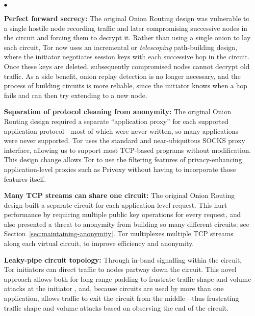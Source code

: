 \documentclass[times,10pt,twocolumn]{article}
\newenvironment{tightlist}{\begin{list}{$\bullet$}{
  \setlength{\itemsep}{0mm}
    \setlength{\parsep}{0mm}
    }}{\end{list}}
\begin{document}
\begin{tightlist}

\item \textbf{Perfect forward secrecy:} The original Onion Routing
design was vulnerable to a single hostile node recording traffic and
later compromising successive nodes in the circuit and forcing them
to decrypt it.  Rather than using a single onion to lay each circuit,
Tor now uses an incremental or \emph{telescoping} path-building design,
where the initiator negotiates session keys with each successive hop in
the circuit.  Once these keys are deleted, subsequently compromised nodes
cannot decrypt old traffic.  As a side benefit, onion replay detection
is no longer necessary, and the process of building circuits is more
reliable, since the initiator knows when a hop fails and can then try
extending to a new node.

\item \textbf{Separation of protocol cleaning from anonymity:}
The original Onion Routing design required a separate ``application
proxy'' for each supported application protocol---most of which were
never written, so many applications were never supported.  Tor uses the
standard and near-ubiquitous SOCKS \cite{socks4} proxy interface, allowing
us to support most TCP-based programs without modification.  This design
change allows Tor to use the filtering features of privacy-enhancing
application-level proxies such as Privoxy \cite{privoxy} without having
to incorporate those features itself.

\item \textbf{Many TCP streams can share one circuit:} The
original Onion Routing design built a separate circuit for each
application-level request.  This hurt performance by requiring
multiple public key operations for every request, and also presented
a threat to anonymity from building so many different circuits; see
Section~\ref{sec:maintaining-anonymity}.  Tor multiplexes multiple TCP
streams along each virtual circuit, to improve efficiency and anonymity.

\item \textbf{Leaky-pipe circuit topology:} Through in-band signalling
within the circuit, Tor initiators can direct traffic to nodes partway
down the circuit. This novel approach allows both for long-range
padding to frustrate traffic shape and volume attacks at the initiator
\cite{defensive-dropping}, and, because circuits are used by more than one
application, allows traffic to exit the circuit from the middle---thus
frustrating traffic shape and volume attacks based on observing the end
of the circuit.


\end{tightlist}
\end{document}
